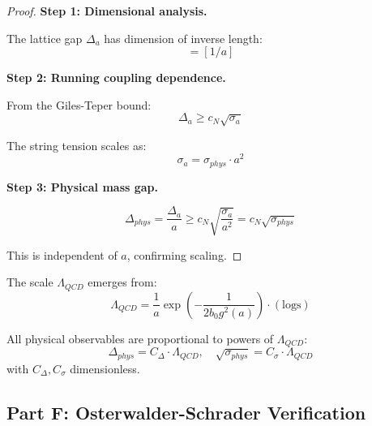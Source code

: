 \begin{proof}
\textbf{Step 1: Dimensional analysis.}

The lattice gap $\Delta_a$ has dimension of inverse length:
\begin{equation}
[\Delta_a] = [1/a]
\end{equation}

\textbf{Step 2: Running coupling dependence.}

From the Giles-Teper bound:
\begin{equation}
\Delta_a \geq c_N \sqrt{\sigma_a}
\end{equation}

The string tension scales as:
\begin{equation}
\sigma_a = \sigma_{phys} \cdot a^2
\end{equation}

\textbf{Step 3: Physical mass gap.}

\begin{equation}
\Delta_{phys} = \frac{\Delta_a}{a} \geq c_N \sqrt{\frac{\sigma_a}{a^2}} = c_N \sqrt{\sigma_{phys}}
\end{equation}

This is independent of $a$, confirming scaling.
\end{proof}

\begin{theorem}
\label{thm:dim-trans}
The scale $\Lambda_{QCD}$ emerges from:
\begin{equation}
\Lambda_{QCD} = \frac{1}{a} \exp\left(-\frac{1}{2b_0 g^2(a)}\right) \cdot (\text{logs})
\end{equation}

All physical observables are proportional to powers of $\Lambda_{QCD}$:
\begin{equation}
\Delta_{phys} = C_\Delta \cdot \Lambda_{QCD}, \quad \sqrt{\sigma_{phys}} = C_\sigma \cdot \Lambda_{QCD}
\end{equation}
with $C_\Delta, C_\sigma$ dimensionless.
\end{theorem}

\subsection{Part F: Osterwalder-Schrader Verification}

